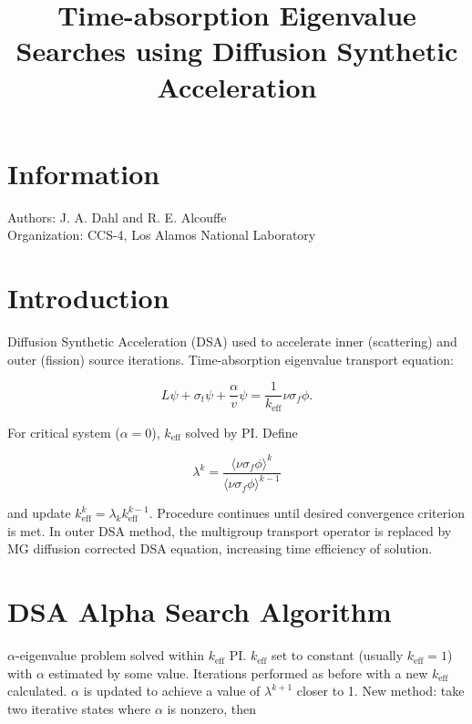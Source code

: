 \documentclass{article}
\title{Time-absorption Eigenvalue Searches using Diffusion Synthetic Acceleration}
\date{\vspace{-5ex}}
\begin{document}
\maketitle

\section*{Information}

Authors: J. A. Dahl and R. E. Alcouffe \\

Organization: CCS-4, Los Alamos National Laboratory

\section*{Introduction}

Diffusion Synthetic Acceleration (DSA) used to accelerate inner (scattering) and outer (fission) source iterations. Time-absorption eigenvalue transport equation:

\begin{equation*}
L \psi + \sigma_t \psi + \frac{\alpha}{v} \psi = \frac{1}{k_{\text{eff}}} \nu \sigma_f \phi.
\end{equation*}

For critical system ($\alpha = 0$), $k_{\text{eff}}$ solved by PI. Define

\begin{equation*}
\lambda^k = \frac{ \langle \nu \sigma_f \phi \rangle ^{k}}{ \langle \nu \sigma_f \phi \rangle ^{k-1} }
\end{equation*}

and update $k_{\text{eff}}^{k} = \lambda_k k_{\text{eff}}^{k-1}$. Procedure continues until desired convergence criterion is met. In outer DSA method, the multigroup transport operator is replaced by MG diffusion corrected DSA equation, increasing time efficiency of solution.

\section*{DSA Alpha Search Algorithm}

$\alpha$-eigenvalue problem solved within $k_{\text{eff}}$ PI. $k_{\text{eff}}$ set to constant (usually $k_{\text{eff}}=1$) with $\alpha$ estimated by some value. Iterations performed as before with a new $k_{\text{eff}}$ calculated. $\alpha$ is updated to achieve a value of $\lambda^{k+1}$ closer to 1. New method: take two iterative states where $\alpha$ is nonzero, then
\end{document}
